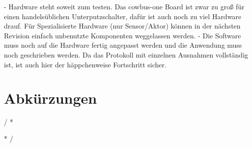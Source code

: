 \documentclass{IEEEtran}
\begin{document}
- Hardware steht soweit zum testen. Das cowbus-one Board ist zwar zu groß für einen handelsüblichen Unterputzschalter, dafür ist auch noch zu viel Hardware drauf. Für Spezialisierte Hardware (nur Sensor/Aktor) können in der nächsten Revision einfach unbenutzte Komponenten weggelassen werden.
- Die Software muss noch auf die Hardware fertig angepasst werden und die Anwendung muss noch geschrieben werden. Da das Protokoll mit einzelnen Ausnahmen vollständig ist, ist auch hier der häppchenweise Fortschritt sicher.




\section*{Abkürzungen}
\renewcommand{\IEEEiedlistdecl}{\IEEEsetlabelwidth{CSMA/CA}}
\begin{acronym}
\end{acronym}
\renewcommand{\IEEEiedlistdecl}{\relax}%


\comment / *
\listoffigures
\clearpage

\listoftables
\clearpage
* /



\end{document}
